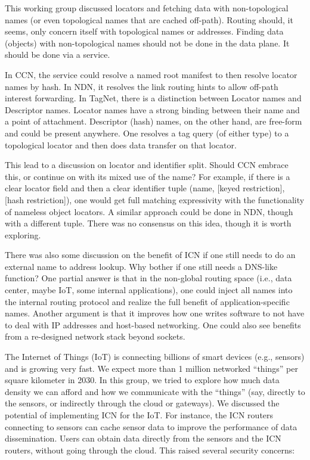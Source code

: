 \documentclass[a4paper,UKenglish]{dagrep}
\begin{document}
This working group discussed locators and fetching data with non-topological names (or even topological names that are cached off-path). Routing should, it seems, only concern itself with topological names or addresses.  Finding data (objects) with non-topological names should not be done in the data plane.  It should be done via a service.

In CCN, the service could resolve a named root manifest to then resolve locator names by hash.
In NDN, it resolves the link routing hints to allow off-path interest forwarding. In TagNet,
there is a distinction between Locator names and Descriptor names. Locator names have a
strong binding between their name and a point of attachment. Descriptor (hash) names, on the
other hand, are free-form and could be present anywhere.  One resolves a tag query (of either
type) to a topological locator and then does data transfer on that locator.

This lead to a discussion on locator and identifier split.  Should CCN embrace this, or continue on with its mixed use of the name? For example, if there is a clear locator field and then a clear identifier tuple (name, [keyed restriction], [hash restriction]), one would get full matching expressivity with the functionality of nameless object locators.  A similar approach could be done in NDN, though with a different tuple.  There was no consensus on this idea, though it is worth exploring.

There was also some discussion on the benefit of ICN if one still needs to do an external name to address lookup.  Why bother if one still needs a DNS-like function?  One partial answer is that in the non-global routing space (i.e., data center, maybe IoT, some internal applications), one could inject all names into the internal routing protocol and realize the full benefit of application-specific names.  Another argument is that it improves how one writes software to not have to deal with IP addresses and host-based networking. One could also see benefits from a re-designed network stack beyond sockets.

\license

The Internet of Things (IoT) is connecting billions of smart devices (e.g., sensors) and is growing very fast. We expect more than 1 million networked ``things'' per square kilometer in 2030. In this group, we tried to explore how much data density we can afford
and how we communicate with the ``things'' (say, directly to the sensors, or indirectly through the cloud or gateways). We discussed the potential of implementing ICN for the IoT. For instance, the ICN routers connecting to sensors can cache sensor data to improve the performance of data dissemination. Users can obtain data directly from the sensors and the ICN routers, without going through the cloud. This raised several security concerns:
\end{document}
